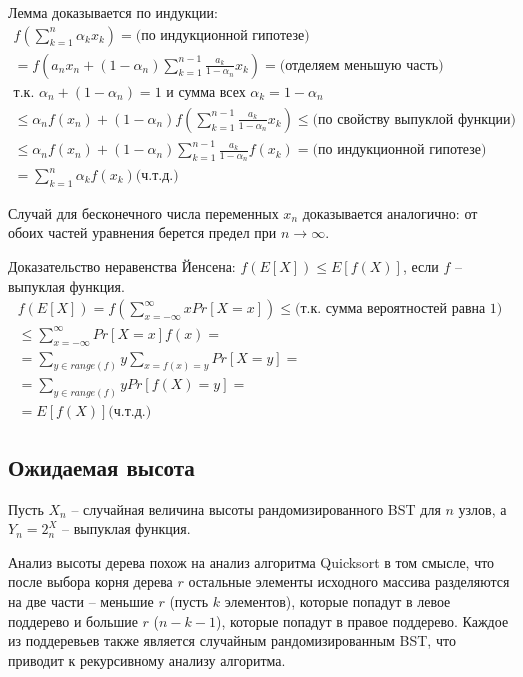 \documentclass[11pt]{article}
\begin{document}
Лемма доказывается по индукции:
\begin{align*}
  f(\sum_{k=1}^{n} \alpha_k x_k) = \text{(по индукционной гипотезе)} \\ 
  = f(a_n x_n + (1-\alpha_n) \sum_{k=1}^{n-1} \frac{a_k}{1-\alpha_n} x_k) = \text{(отделяем меньшую часть)} \\
  \text{т.к. } \alpha_n + (1-\alpha_n) = 1 \text{ и сумма всех } \alpha_k = 1 - \alpha_n \\
  \leqslant \alpha_n f(x_n) + (1-\alpha_n)f(\sum_{k=1}^{n-1} \frac{a_k}{1-\alpha_n} x_k) \leqslant \text{(по свойству выпуклой функции)} \\
  \leqslant \alpha_n f(x_n) + (1-\alpha_n)\sum_{k=1}^{n-1} \frac{a_k}{1-\alpha_n} f(x_k) = \text{(по индукционной гипотезе)} \\
  = \sum_{k=1}^{n} \alpha_k f(x_k) \text{(ч.т.д.)}
\end{align*}

Случай для бесконечного числа переменных $x_n$ доказывается аналогично: от обоих частей уравнения берется предел при $n \to \infty$.

Доказательство неравенства Йенсена: $f(E[X]) \leqslant E[f(X)]$, если $f$ -- выпуклая функция.
\begin{align*}
  f(E[X]) = f(\sum_{x = - \infty}^{\infty} x Pr[X = x]) \leqslant \text{(т.к. сумма вероятностей равна 1)} \\
  \leqslant \sum_{x= - \infty}^{\infty} Pr[X = x] f(x) = \\ 
  = \sum_{y \in range(f)} y \sum_{x = f(x) = y} Pr[X = y] = \\
  = \sum_{y \in range(f)} y Pr[f(X) = y] = \\
  = E[f(X)] \text{(ч.т.д.)}
\end{align*}

\subsection{Ожидаемая высота}

Пусть $X_n$ -- случайная величина высоты рандомизированного BST для $n$ узлов, а $Y_n = 2^X_n$ -- выпуклая функция.

Анализ высоты дерева похож на анализ алгоритма Quicksort в том смысле, что после выбора корня дерева $r$ остальные элементы исходного массива разделяются на две части -- меньшие $r$ (пусть $k$ элементов), которые попадут в левое поддерево и большие $r$ ($n - k - 1$), которые попадут в правое поддерево. Каждое из поддеревьев также является случайным рандомизированным BST, что приводит к рекурсивному анализу алгоритма.
\end{document}
